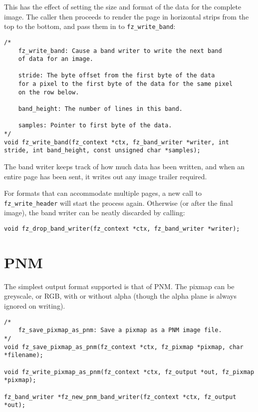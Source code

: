 \documentclass[oneside]{book}
\begin{document}
This has the effect of setting the size and format of the data for the complete image. The caller then proceeds to render the page in horizontal strips from the top to the bottom, and pass them in to \texttt{fz\_write\_band}:

\begin{lstlisting}
/*
	fz_write_band: Cause a band writer to write the next band
	of data for an image.

	stride: The byte offset from the first byte of the data
	for a pixel to the first byte of the data for the same pixel
	on the row below.

	band_height: The number of lines in this band.

	samples: Pointer to first byte of the data.
*/
void fz_write_band(fz_context *ctx, fz_band_writer *writer, int stride, int band_height, const unsigned char *samples);
\end{lstlisting}

The band writer keeps track of how much data has been written, and when an entire page has been sent, it writes out any image trailer required.

For formats that can accommodate multiple pages, a new call to \texttt{fz\_write\_header} will start the process again. Otherwise (or after the final image), the band writer can be neatly discarded by calling:

\begin{lstlisting}
void fz_drop_band_writer(fz_context *ctx, fz_band_writer *writer);
\end{lstlisting}

\section{PNM}

The simplest output format supported is that of PNM. The pixmap can be greyscale, or RGB, with or without alpha (though the alpha plane is always ignored on writing).

\begin{lstlisting}
/*
	fz_save_pixmap_as_pnm: Save a pixmap as a PNM image file.
*/
void fz_save_pixmap_as_pnm(fz_context *ctx, fz_pixmap *pixmap, char *filename);

void fz_write_pixmap_as_pnm(fz_context *ctx, fz_output *out, fz_pixmap *pixmap);

fz_band_writer *fz_new_pnm_band_writer(fz_context *ctx, fz_output *out);
\end{lstlisting}
\end{document}
